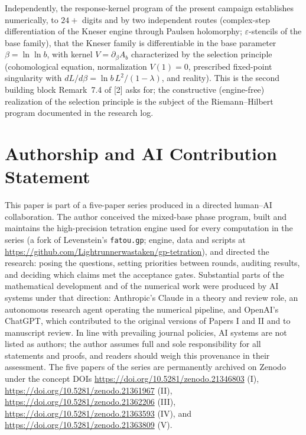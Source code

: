 \documentclass[11pt]{article}
\newcommand{\eps}{\varepsilon}
\begin{document}
Independently, the response-kernel program of the present campaign
establishes numerically, to $24{+}$ digits and by two independent routes
(complex-step differentiation of the Kneser engine through Paulsen
holomorphy; $\eps$-stencils of the base family), that the Kneser family is
differentiable in the base parameter $\beta=\ln\ln b$, with kernel
$V=\partial_\beta A_b$ characterized by the selection principle
(cohomological equation, normalization $V(1)=0$, prescribed fixed-point
singularity with $dL/d\beta=\ln b\,L^2/(1-\lambda)$, and reality).  This is
the second building block Remark~7.4 of [2] asks for; the constructive
(engine-free) realization of the selection principle is the subject of the
Riemann--Hilbert program documented in the research log.


\section*{Authorship and AI Contribution Statement}
This paper is part of a five-paper series produced in a directed human--AI
collaboration. The author conceived the mixed-base phase program, built and
maintains the high-precision tetration engine used for every computation in
the series (a fork of Levenstein's \texttt{fatou.gp}; engine, data and
scripts at \url{https://github.com/Lightrunnerwastaken/gp-tetration}), and directed the research: posing the questions,
setting priorities between rounds, auditing results, and deciding which
claims met the acceptance gates. Substantial parts of the mathematical
development and of the numerical work were produced by AI systems under
that direction: Anthropic's Claude in a theory and review role, an
autonomous research agent operating the numerical pipeline, and OpenAI's
ChatGPT, which contributed to the original versions of Papers I and II and
to manuscript review. In line with prevailing journal policies, AI systems
are not listed as authors; the author assumes full and sole responsibility
for all statements and proofs, and readers should weigh this provenance in
their assessment. The five papers of the series are permanently archived on Zenodo under the concept DOIs \url{https://doi.org/10.5281/zenodo.21346803} (I), \url{https://doi.org/10.5281/zenodo.21361967} (II), \url{https://doi.org/10.5281/zenodo.21362206} (III), \url{https://doi.org/10.5281/zenodo.21363593} (IV), and \url{https://doi.org/10.5281/zenodo.21363809} (V).
\end{document}

